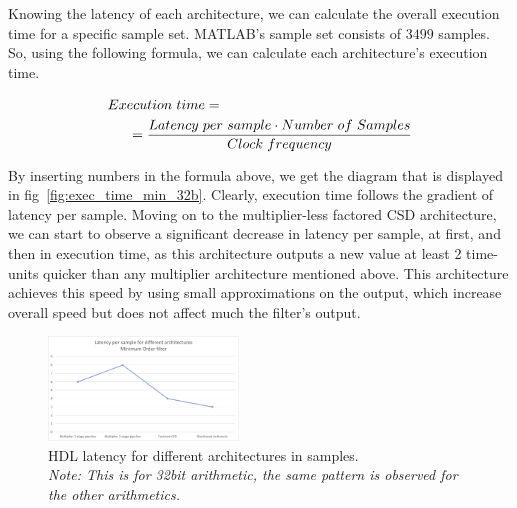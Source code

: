 Knowing the latency of each architecture, we can calculate the overall execution time for a specific sample set. MATLAB's sample set consists of $3499$ samples. So, using the following formula, we can calculate each architecture's execution time.
\begin{small}
\begin{equation}
	\centering
	\begin{split}
		Execution\hspace{3pt} time &= \\
		& \hspace{-55pt} =\frac{{Latency \hspace{3pt} per \hspace{3pt} sample}\cdot{Number \hspace{3pt} of \hspace{3pt} Samples}}{{Clock \hspace{3pt} frequency}}
	\end{split}
\end{equation}
\end{small}
By inserting numbers in the formula above, we get the diagram that is displayed in fig~\ref{fig:exec_time_min_32b}. Clearly, execution time follows the gradient of latency per sample.
Moving on to the multiplier-less factored CSD architecture, we can start to observe a significant decrease in latency per sample, at first, and then in execution time, as this architecture outputs a new value at least 2 time-units quicker than any multiplier architecture mentioned above. This architecture achieves this speed by using small approximations on the output, which increase overall speed but does not affect much the filter's output.


\begin{figure}[htbp]
	\centering
	\includegraphics[width=0.45\textwidth]{../Images/FIR_min_Order/hdl_latency_32bits.png}
	\caption{HDL latency for different architectures in samples.\\ \textit{Note: This is for 32bit arithmetic, the same pattern is observed for the other arithmetics.}}
	\label{fig:hdl_latency_min_32b}
\end{figure}


